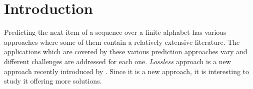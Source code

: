 \begin{comment}
(more references in the text
et al for more than two names
no titles of papers in text
add more references
leandro tell him to send you the email
Continue more with TECHNICAL details - seriously


-wavelet trees, quest for large datasets
-sds go deeply like wavelet trees that I used
-thesis citation of Dany
-simon talk about counting most frequent and top K(top k not studied in literature)

-plan of the thesis; predictors and sds for them, or find predictors and then sds for them (section ~4) - introduce sds as an introduction there

)
1. different implementations II for CPT
2. (work focussed on 3 arreas: what I have done and what next)
		prediction context = prefix
3. predictors (markovian ones)
4. try to put down why CPT is not scalable with parameters

On sds appendix give space and time complexity!!!! We reduce both space and time!!!
----------
introduce the 3 things that I focus in introduction with a structure plan:

1) prediction task
2) predictor
3) implementation

shrink 4 with 5.--> 1) efficient (scalable, robust predictable performance) data structures to support sequence prediction
					2) investigate/develop more accurate predictors
					3) Explore appropriate ways to evaluate predictors
					some preliminary work on 3 done, 
	challenge: 	evaluating sequence prediction is not very clear expect from correct or not (careful how to evaluate)
				simultaneously space and time efficiency	(predictable)
				we may have to explore more/different  unimplemented sds
				
							

\end{comment}

\section{Introduction}
Predicting the next item of a sequence over a finite alphabet has various approaches where some of them contain a relatively extensive literature. The applications which are covered by these various prediction approaches vary and different challenges are addressed for each one. \emph{Lossless} approach is a new approach  recently introduced by \citeauthor{gueniche_fournier-viger_tseng_2013} \citeyear{gueniche_fournier-viger_tseng_2013}. Since it is a new approach, it is interesting to study it offering more solutions.

